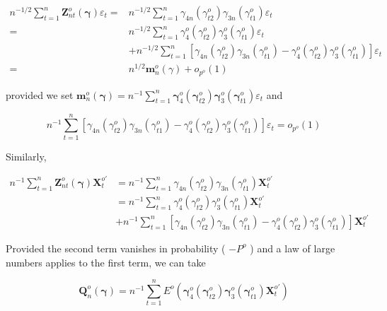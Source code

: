 \documentclass[10pt]{article}
\begin{document}
$$
\begin{aligned}
n^{-1 / 2} \sum_{t=1}^{n} \mathbf{Z}_{n t}^{o}(\boldsymbol{\gamma}) \varepsilon_{t}= & n^{-1 / 2} \sum_{t=1}^{n} \gamma_{4 n}\left(\gamma_{t 2}^{o}\right) \gamma_{3 n}\left(\gamma_{t 1}^{o}\right) \varepsilon_{t} \\
= & n^{-1 / 2} \sum_{t=1}^{n} \gamma_{4}^{o}\left(\gamma_{t 2}^{o}\right) \gamma_{3}^{o}\left(\gamma_{t 1}^{o}\right) \varepsilon_{t} \\
& +n^{-1 / 2} \sum_{t=1}^{n}\left[\gamma_{4 n}\left(\gamma_{t 2}^{o}\right) \gamma_{3 n}\left(\gamma_{t 1}^{o}\right)-\gamma_{4}^{o}\left(\gamma_{t 2}^{o}\right) \gamma_{3}^{o}\left(\gamma_{t 1}^{o}\right)\right] \varepsilon_{t} \\
= & n^{1 / 2} \mathbf{m}_{n}^{o}(\gamma)+o_{p^{o}}(1)
\end{aligned}
$$

provided we set $\mathbf{m}_{n}^{o}(\boldsymbol{\gamma})=n^{-1} \sum_{t=1}^{n} \boldsymbol{\gamma}_{4}^{o}\left(\boldsymbol{\gamma}_{t 2}^{o}\right) \boldsymbol{\gamma}_{3}^{o}\left(\boldsymbol{\gamma}_{t 1}^{o}\right) \varepsilon_{t}$ and

$$
n^{-1} \sum_{t=1}^{n}\left[\gamma_{4 n}\left(\gamma_{t 2}^{o}\right) \gamma_{3 n}\left(\gamma_{t 1}^{o}\right)-\gamma_{4}^{o}\left(\gamma_{t 2}^{o}\right) \gamma_{3}^{o}\left(\gamma_{t 1}^{o}\right)\right] \varepsilon_{t}=o_{p^{o}}(1)
$$

Similarly,

$$
\begin{aligned}
n^{-1} \sum_{t=1}^{n} \mathbf{Z}_{n t}^{o}(\boldsymbol{\gamma}) \mathbf{X}_{t}^{o \prime} & =n^{-1} \sum_{t=1}^{n} \gamma_{4 n}\left(\gamma_{t 2}^{o}\right) \gamma_{3 n}\left(\gamma_{t 1}^{o}\right) \mathbf{X}_{t}^{o \prime} \\
& =n^{-1} \sum_{t=1}^{n} \gamma_{4}^{o}\left(\gamma_{t 2}^{o}\right) \gamma_{3}^{o}\left(\gamma_{t 1}^{o}\right) \mathbf{X}_{t}^{o \prime} \\
& +n^{-1} \sum_{t=1}^{n}\left[\gamma_{4 n}\left(\gamma_{t 2}^{o}\right) \gamma_{3 n}\left(\gamma_{t 1}^{o}\right)-\gamma_{4}^{o}\left(\gamma_{t 2}^{o}\right) \gamma_{3}^{o}\left(\gamma_{t 1}^{o}\right)\right] \mathbf{X}_{t}^{o \prime}
\end{aligned}
$$

Provided the second term vanishes in probability ( $-P^{o}$ ) and a law of large numbers applies to the first term, we can take

$$
\mathbf{Q}_{n}^{o}(\boldsymbol{\gamma})=n^{-1} \sum_{t=1}^{n} E^{o}\left(\boldsymbol{\gamma}_{4}^{o}\left(\boldsymbol{\gamma}_{t 2}^{o}\right) \boldsymbol{\gamma}_{3}^{o}\left(\boldsymbol{\gamma}_{t 1}^{o}\right) \mathbf{X}_{t}^{o \prime}\right)
$$
\end{document}
